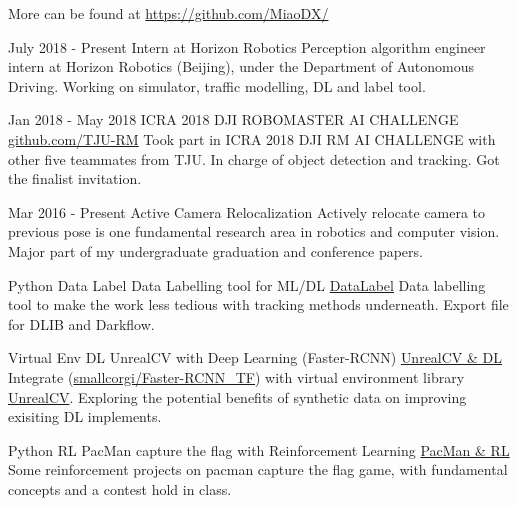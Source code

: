 \documentclass[utf8]{twentysecondcv} %
\begin{document}
\begin{twenty}
    \vspace{-8pt}
    \twentyitem
        {}
        {}        
        {More can be found at \href{https://github.com/MiaoDX/}{https://github.com/MiaoDX/}}
        {}
        {}
        {}
        
    
    \twentyitem
    {July 2018 - }
    {Present}
    {Intern at Horizon Robotics}
    {}
    {}
    {Perception algorithm engineer intern at Horizon Robotics (Beijing), under the Department of Autonomous Driving. Working on simulator, traffic modelling, DL and label tool.\vspace{7pt}}
	
          
    \twentyitem
    {Jan 2018 - }
    {May 2018}
    {ICRA 2018 DJI ROBOMASTER AI CHALLENGE}
    {\href{https://github.com/TJU-RM}{github.com/TJU-RM}}
    {}
    {Took part in ICRA 2018 DJI RM AI CHALLENGE with other five teammates from TJU. In charge of object detection and tracking. Got the finalist invitation.}
    
    \twentyitem
    {Mar 2016 -}
    {Present}
    {Active Camera Relocalization}
    {}
    {}
    {Actively relocate camera to previous pose is one fundamental research area in robotics and computer vision. Major part of my undergraduate graduation and conference papers.}
    
	\twentyitem
        {Python}
		{Data Label}
        {Data Labelling tool for ML/DL}
        {\href{https://github.com/MiaoDX/DataLabel}{DataLabel}}
        {}
        {Data labelling tool to make the work less tedious with tracking methods underneath. Export file for DLIB and Darkflow.}
          
    \twentyitem
        {Virtual Env}
      	{DL}
        {UnrealCV with Deep Learning (Faster-RCNN)}
        {\href{https://github.com/MiaoDX/unrealcv_examples/}{UnrealCV \& DL}}
        {}
        {Integrate (\href{https://github.com/smallcorgi/Faster-RCNN\_TF}{smallcorgi/Faster-RCNN\_TF}) with virtual environment library \href{https://github.com/unrealcv/unrealcv}{UnrealCV}. Exploring the potential benefits of synthetic data on improving exisiting DL implements.}
                 
    \twentyitem
        {Python}
		{RL}
        {PacMan capture the flag with Reinforcement Learning}
        {\href{https://github.com/MiaoDX/hand_in_homework/tree/master/Advanced\_AI/}{PacMan \& RL}}
        {}
        {Some reinforcement projects on pacman capture the flag game, with fundamental concepts and a contest hold in class.}
        

\end{twenty}
\end{document}
